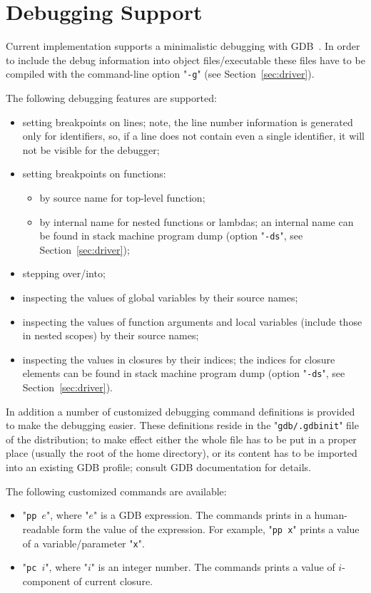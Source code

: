 \chapter{Debugging Support}
\label{sec:debugging}

Current implementation supports a minimalistic debugging with \textsc{GDB}~\cite{gdb}. In order to include the debug information into object files/executable these files
have to be compiled with the command-line option "\texttt{-g}" (see Section~\ref{sec:driver}).

The following debugging features are supported:

\begin{itemize}
\item setting breakpoints on lines; note, the line number information is generated only for identifiers, so, if a line does not contain even a single identifier, it
  will not be visible for the debugger;
\item setting breakpoints on functions:
  \begin{itemize}
    \item by source name for top-level function;
    \item by internal name for nested functions or lambdas; an internal name can be found in stack machine program dump (option "\texttt{-ds}", see Section~\ref{sec:driver});
  \end{itemize}
\item stepping over/into;
\item inspecting the values of global variables by their source names;
\item inspecting the values of function arguments and local variables (include those in nested scopes) by their source names;
\item inspecting the values in closures by their indices; the indices for closure elements can be found in stack machine
  program dump (option "\texttt{-ds}", see Section~\ref{sec:driver}).
\end{itemize}

In addition a number of customized debugging command definitions is provided to make the debugging easier. These definitions reside in the "\texttt{gdb/.gdbinit}"
file of the distribution; to make effect either the whole file has to be put in a proper place (usually the root of the home directory), or its content has to be
imported into an existing \textsc{GDB} profile; consult \textsc{GDB} documentation for details.

The following customized commands are available:

\begin{itemize}
\item "\texttt{pp }$e$", where "$e$" is a \textsc{GDB} expression. The commands prints in a human-readable form the value of the expression. For example,
  "\texttt{pp x}" prints a value of a variable/parameter "\texttt{x}".
\item "\texttt{pc }$i$", where "$i$" is an integer number. The commands prints a value of $i$-component of current closure.
\end{itemize}


